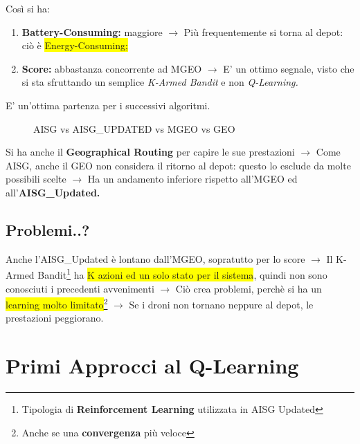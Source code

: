 \documentclass[12pt]{article}
\begin{document}
Così si ha:

\begin{enumerate}
    \item \textbf{Battery-Consuming:} maggiore $\rightarrow$ Più frequentemente si torna al depot: ciò è \colorbox{yellow}{Energy-Consuming;}
    
    \item \textbf{Score:} abbastanza concorrente ad MGEO $\rightarrow$ E' un ottimo segnale, visto che si sta sfruttando un semplice \textit{K-Armed Bandit} e non \textit{Q-Learning.}
\end{enumerate}

E' un'ottima partenza per i successivi algoritmi.

\begin{figure}[H]
    
    \qquad
    \caption{AISG vs AISG\_UPDATED vs MGEO vs GEO}%
    \label{fig:example}%
\end{figure}

Si ha anche il \textbf{Geographical Routing} per capire le sue prestazioni $\rightarrow$ Come AISG, anche il GEO non considera il ritorno al depot: questo lo esclude da molte possibili scelte $\rightarrow$ Ha un andamento inferiore rispetto all'MGEO ed all'\textbf{AISG\_Updated.}

\subsection{Problemi..?}

Anche l'AISG\_Updated è lontano dall'MGEO, sopratutto per lo score $\rightarrow$ Il K-Armed Bandit\footnote{Tipologia di \textbf{Reinforcement Learning} utilizzata in AISG Updated} ha \colorbox{yellow}{K azioni ed un solo stato per il sistema}, quindi non sono conosciuti i precedenti avvenimenti $\rightarrow$ Ciò crea problemi, perchè si ha un \colorbox{yellow}{learning molto limitato}\footnote{Anche se una \textbf{convergenza} più veloce} $\rightarrow$ Se i droni non tornano neppure al depot, le prestazioni peggiorano.

\section{Primi Approcci al Q-Learning}
\end{document}
